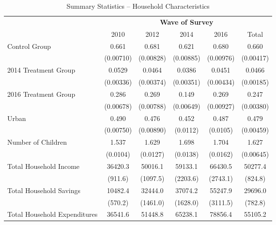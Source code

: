 \documentclass[12pt]{extarticle}
\begin{document}
\begin{table}
\centering
\caption{Summary Statistics -- Household Characteristics} \label{tab:sumstats1}
\begin{threeparttable}
\begin{tabular}{l*{5}{c}}
\hline\hline
                    &\multicolumn{5}{c}{\textbf{Wave of Survey}}                                         \\
\cline{2-6}
                    &        2010&        2012&        2014&        2016&       Total\\
\hline
Control Group       &       0.661&       0.681&       0.621&       0.680&       0.660\\
                    &   (0.00710)&   (0.00828)&   (0.00885)&   (0.00976)&   (0.00417)\\
[1em]
2014 Treatment Group&      0.0529&      0.0464&      0.0386&      0.0451&      0.0466\\
                    &   (0.00336)&   (0.00374)&   (0.00351)&   (0.00434)&   (0.00185)\\
[1em]
2016 Treatment Group&       0.286&       0.269&       0.149&       0.269&       0.247\\
                    &   (0.00678)&   (0.00788)&   (0.00649)&   (0.00927)&   (0.00380)\\
[1em]
Urban               &       0.490&       0.476&       0.452&       0.487&       0.479\\
                    &   (0.00750)&   (0.00890)&    (0.0112)&    (0.0105)&   (0.00459)\\
[1em]
Number of Children  &       1.537&       1.629&       1.698&       1.704&       1.627\\
                    &    (0.0104)&    (0.0127)&    (0.0138)&    (0.0162)&   (0.00645)\\
[1em]
Total Household Income&     36420.3&     50016.1&     59133.1&     66430.5&     50277.4\\
                    &     (911.6)&    (1097.5)&    (2203.6)&    (2743.1)&     (824.8)\\
[1em]
Total Household Savings&     10482.4&     32444.0&     37074.2&     55247.9&     29696.0\\
                    &     (570.2)&    (1461.0)&    (1628.0)&    (3111.5)&     (782.8)\\
\hline                   
Total Household Expenditures&     36541.6&     51448.8&     65238.1&     78856.4&     55105.2\\

\end{tabular}
\end{threeparttable}
\end{table}
\end{document}
